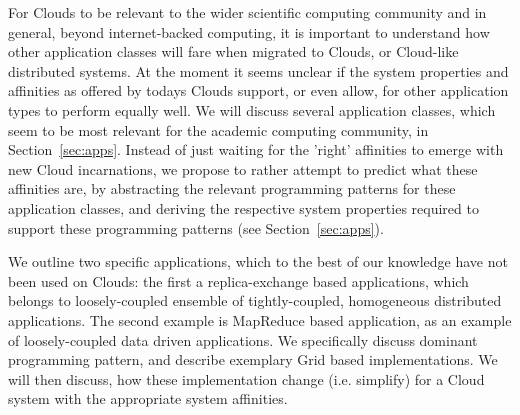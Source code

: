 \documentclass{article}
\newcommand{\amnote}[1]{   {\textcolor{magenta}{ ***Andre:    #1 }}}
\newcommand{\amnote}[1]{}
\begin{document}

For Clouds to be relevant to the wider scientific computing community
and in general, beyond internet-backed computing, it is important to
understand how other application classes will fare when migrated to Clouds,
or Cloud-like distributed systems.  At the moment it seems unclear if
the system properties and affinities as offered by todays Clouds
support, or even allow, for other application types to perform equally
well.  We will discuss several application classes, which seem to be
most relevant for the academic computing community, in
Section~\ref{sec:apps}.  Instead of just waiting for the 'right'
affinities to emerge with new Cloud incarnations, we propose to rather attempt to
predict what these affinities are, by abstracting the relevant
programming patterns for these application classes, and deriving the
respective system properties required to support these programming
patterns (see Section~\ref{sec:apps}).
 

We outline two specific applications, which to the best of our
knowledge have not been used on Clouds: the first a replica-exchange
based applications, which belongs to loosely-coupled ensemble of
tightly-coupled, homogeneous distributed applications. The second
example is MapReduce based application, as an example of
loosely-coupled data driven applications. We specifically discuss
dominant programming pattern, and describe exemplary Grid based
implementations.  We will then discuss, how these implementation
change (i.e. simplify) for a Cloud system with the appropriate system
affinities.  

% 
\end{document}

